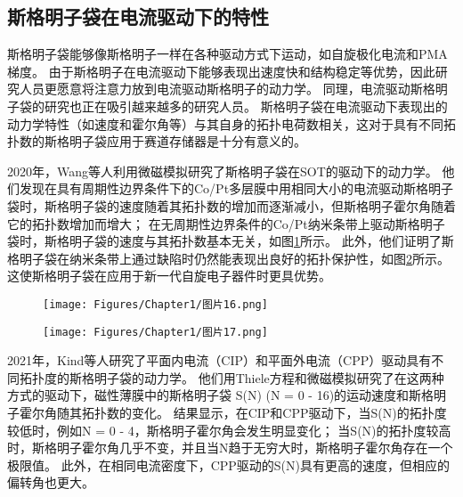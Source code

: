 \subsection{斯格明子袋在电流驱动下的特性}
斯格明子袋能够像斯格明子一样在各种驱动方式下运动，如自旋极化电流和PMA梯度。
由于斯格明子在电流驱动下能够表现出速度快和结构稳定等优势，因此研究人员更愿意将注意力放到电流驱动斯格明子的动力学。
同理，电流驱动斯格明子袋的研究也正在吸引越来越多的研究人员。
斯格明子袋在电流驱动下表现出的动力学特性（如速度和霍尔角等）与其自身的拓扑电荷数相关，这对于具有不同拓扑数的斯格明子袋应用于赛道存储器是十分有意义的。\par
2020年，Wang等人利用微磁模拟研究了斯格明子袋在SOT的驱动下的动力学。
他们发现在具有周期性边界条件下的Co/Pt多层膜中用相同大小的电流驱动斯格明子袋时，斯格明子袋的速度随着其拓扑数的增加而逐渐减小，但斯格明子霍尔角随着它的拓扑数增加而增大；
在无周期性边界条件的Co/Pt纳米条带上驱动斯格明子袋时，斯格明子袋的速度与其拓扑数基本无关，如图\ref{图1.16}所示。
此外，他们证明了斯格明子袋在纳米条带上通过缺陷时仍然能表现出良好的拓扑保护性，如图\ref{图1.17}所示。这使斯格明子袋在应用于新一代自旋电子器件时更具优势。
\begin{figure}[htb]
    \centering
    \texttt{[image: Figures/Chapter1/图片16.png]}
    \label{图1.16}
\end{figure}
\begin{figure}[H]
    \centering
    \texttt{[image: Figures/Chapter1/图片17.png]}
    \label{图1.17}
\end{figure}\par
2021年，Kind等人研究了平面内电流（CIP）和平面外电流（CPP）驱动具有不同拓扑度的斯格明子袋的动力学。
他们用Thiele方程和微磁模拟研究了在这两种方式的驱动下，磁性薄膜中的斯格明子袋 S(N) (N = 0 - 16)的运动速度和斯格明子霍尔角随其拓扑数的变化。
结果显示，在CIP和CPP驱动下，当S(N)的拓扑度较低时，例如N = 0 - 4，斯格明子霍尔角会发生明显变化；
当S(N)的拓扑度较高时，斯格明子霍尔角几乎不变，并且当N趋于无穷大时，斯格明子霍尔角存在一个极限值。
此外，在相同电流密度下，CPP驱动的S(N)具有更高的速度，但相应的偏转角也更大。
